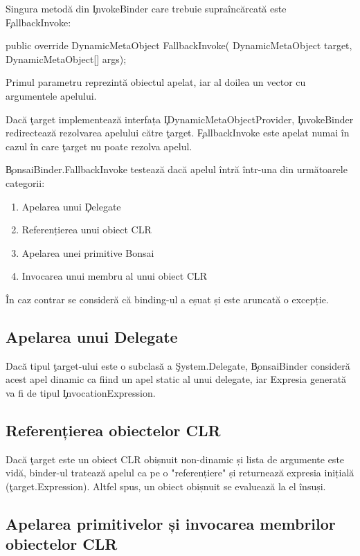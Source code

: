 \documentclass[12pt,a4paper]{memoir}
\begin{document}
Singura metodă din \c{InvokeBinder} care trebuie supraîncărcată este \c{FallbackInvoke}:
\begin{code}
public override DynamicMetaObject FallbackInvoke(
  DynamicMetaObject target,
  DynamicMetaObject[] args);
\end{code}
Primul parametru reprezintă obiectul apelat, iar al doilea un vector cu argumentele apelului.

Dacă \c{target} implementează interfața \c{IDynamicMetaObjectProvider}, \c{InvokeBinder} redirectează rezolvarea apelului către \c{target}. \c{FallbackInvoke} este apelat numai în cazul în care \c{target} nu poate rezolva apelul.

\c{BonsaiBinder.FallbackInvoke} testează dacă apelul întră într-una din următoarele categorii:
\begin{enumerate}
\item Apelarea unui \c{Delegate}
\item Referențierea unui obiect CLR
\item Apelarea unei primitive Bonsai
\item Invocarea unui membru al unui obiect CLR
\end{enumerate}

În caz contrar se consideră că binding-ul a eșuat și este aruncată o excepție.

\subsection{Apelarea unui Delegate}

Dacă tipul \c{target}-ului este o subclasă a \c{System.Delegate}, \c{BonsaiBinder} consideră acest apel dinamic ca fiind un apel static al unui delegate, iar Expresia generată va fi de tipul \c{InvocationExpression}.

\subsection{Referențierea obiectelor CLR}

Dacă \c{target} este un obiect CLR obișnuit non-dinamic și lista de argumente este vidă, binder-ul tratează apelul ca pe o "referențiere" și returnează expresia inițială (\c{target.Expression}). Altfel spus, un obiect obișnuit se evaluează la el însuși.

\subsection{Apelarea primitivelor și invocarea membrilor obiectelor CLR}
\end{document}
